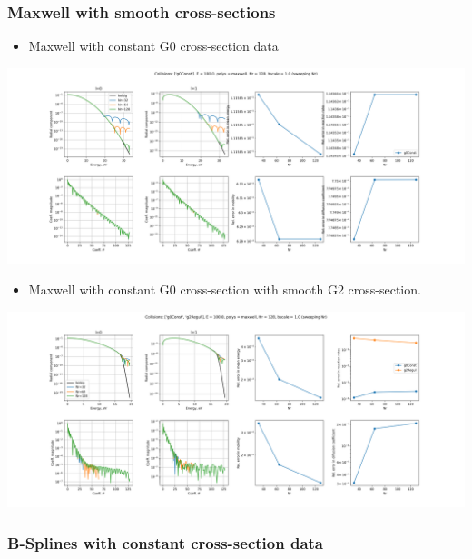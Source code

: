 \documentclass[mathserif, aspectratio=169]{beamer}
\begin{document}
\begin{frame}
	\frametitle{Maxwell with smooth cross-sections}
	\only<+>
	{
		\begin{itemize}
			\item Maxwell with constant G0 cross-section data
		\end{itemize}
		\includegraphics[width=\textwidth]{fig/maxwell_vs_bolsig_g0Const_E100.0_poly_maxwell_nr128_bscale1.0_sweeping_Nr.png}
	}
	\only<+>
	{
		\begin{itemize}
			\item Maxwell with constant G0 cross-section with smooth G2 cross-section. 
		\end{itemize}
		\includegraphics[width=\textwidth]{fig/maxwell_vs_bolsig_g0Const_g2Regul_E100.0_poly_maxwell_nr128_bscale1.0_sweeping_Nr.png}
	}

\end{frame}

\begin{frame}
	\frametitle{B-Splines with constant cross-section data}
\end{frame}
\end{document}
